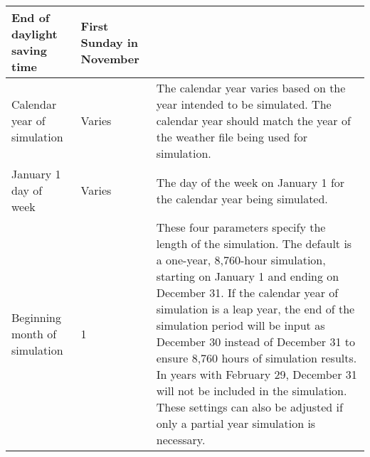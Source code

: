 \begin{table}[h!]
\begin{tabular}{|p{1.25in}|p{0.75in}|p{4in}|}
End of daylight saving time                                                              & First Sunday in November &                                                                                                                                                                                                                                                                                                                                                                                                                                                                                                                                                                          \\ \hline
Calendar year of simulation                                                               & Varies                 & The calendar year varies based on the year intended to be simulated. The calendar year should match the year of the weather file being used for simulation.                                                                                                                                                                                                                                                                                                                                                                                                              \\ \hline
January 1 day of week                                                                 & Varies                 & The day of the week on January 1 for the calendar year being simulated.                                                                                                                                                                                                                                                                                                                                                                                                                                                                                                \\ \hline
Beginning month of simulation                                                             & 1                      & \multirow{2}{4in}{These four parameters specify the length of the simulation. The default is a one-year, 8,760-hour simulation, starting on January 1 and ending on December 31. If the calendar year of simulation is a leap year, the end of the simulation period will be input as December 30 instead of December 31 to ensure 8,760 hours of simulation results. In years with February 29, December 31 will not be included in the simulation. These settings can also be adjusted if only a partial year simulation is necessary.}                 

\end{tabular}
\end{table}
